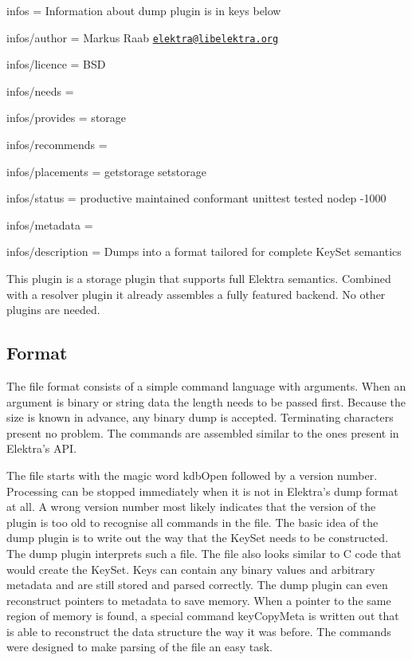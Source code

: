 
\begin{DoxyItemize}
\item infos = Information about dump plugin is in keys below
\item infos/author = Markus Raab \href{mailto:elektra@libelektra.org}{\tt elektra@libelektra.\+org}
\item infos/licence = B\+S\+D
\item infos/needs =
\item infos/provides = storage
\item infos/recommends =
\item infos/placements = getstorage setstorage
\item infos/status = productive maintained conformant unittest tested nodep -\/1000
\item infos/metadata =
\item infos/description = Dumps into a format tailored for complete Key\+Set semantics
\end{DoxyItemize}

This plugin is a storage plugin that supports full Elektra semantics. Combined with a resolver plugin it already assembles a fully featured backend. No other plugins are needed.

\subsection*{Format}

The file format consists of a simple command language with arguments. When an argument is binary or string data the length needs to be passed first. Because the size is known in advance, any binary dump is accepted. Terminating characters present no problem. The commands are assembled similar to the ones present in Elektra’s A\+P\+I.

The file starts with the magic word {\ttfamily kdb\+Open} followed by a version number. Processing can be stopped immediately when it is not in Elektra’s dump format at all. A wrong version number most likely indicates that the version of the plugin is too old to recognise all commands in the file. The basic idea of the dump plugin is to write out the way that the Key\+Set needs to be constructed. The dump plugin interprets such a file. The file also looks similar to C code that would create the Key\+Set. Keys can contain any binary values and arbitrary metadata and are still stored and parsed correctly. The dump plugin can even reconstruct pointers to metadata to save memory. When a pointer to the same region of memory is found, a special command {\ttfamily key\+Copy\+Meta} is written out that is able to reconstruct the data structure the way it was before. The commands were designed to make parsing of the file an easy task.

